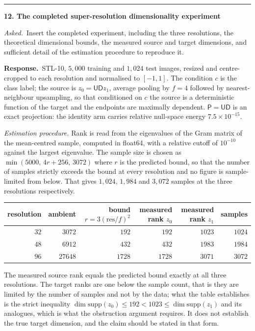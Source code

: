 \documentclass[11pt]{article}
\newenvironment{item12}[1]{%
  \par\medskip\noindent\rule{\textwidth}{0.7pt}\par\nobreak\smallskip
  \noindent\textbf{\large #1}\par\nobreak\smallskip
}{\par\medskip}
\newcommand{\ask}[1]{\noindent\emph{Asked.}\ #1\par\smallskip}
\newcommand{\resp}{\noindent\textbf{Response.}\ }
\begin{document}
\begin{item12}{12. The completed super-resolution dimensionality experiment}
\ask{Insert the completed experiment, including the three resolutions, the theoretical
dimensional bounds, the measured source and target dimensions, and sufficient detail of the
estimation procedure to reproduce it.}

\resp STL-10, $5{,}000$ training and $1{,}024$ test images, resized and centre-cropped to each
resolution and normalised to $[-1,1]$. The condition $c$ is the class label; the source is
$z_0=\mathsf{UD}z_1$, average pooling by $f=4$ followed by nearest-neighbour upsampling, so that
conditioned on $c$ the source is a deterministic function of the target and the endpoints are
maximally dependent. $\mathsf P=\mathsf{UD}$ is an exact projection: the identity arm carries
relative null-space energy $7.5\times10^{-15}$.

\emph{Estimation procedure.} Rank is read from the eigenvalues of the Gram matrix of the
mean-centred sample, computed in float64, with a relative cutoff of $10^{-10}$ against the
largest eigenvalue. The sample size is chosen as $\min(5000,\,4r+256,\,3072)$ where $r$ is the
predicted bound, so that the number of samples strictly exceeds the bound at every resolution and
no figure is sample-limited from below. That gives $1{,}024$, $1{,}984$ and $3{,}072$ samples at
the three resolutions respectively.

\begin{center}
\small
\begin{tabular}{@{}rrrrrr@{}}
\toprule
resolution & ambient & bound $r=3(\mathrm{res}/f)^2$ & measured rank $z_0$ &
measured rank $z_1$ & samples\\
\midrule
$32$ & $3072$  & $192$  & $192$  & $1023$ & $1024$\\
$48$ & $6912$  & $432$  & $432$  & $1983$ & $1984$\\
$96$ & $27648$ & $1728$ & $1728$ & $3071$ & $3072$\\
\bottomrule
\end{tabular}
\end{center}

The measured source rank equals the predicted bound exactly at all three resolutions. The target
ranks are one below the sample count, that is they are limited by the number of samples and not
by the data; what the table establishes is the strict inequality
$\dim\mathrm{supp}(z_0)\le 192 < 1023 \le \dim\mathrm{supp}(z_1)$ and its analogues, which is
what the obstruction argument requires. It does not establish the true target dimension, and the
claim should be stated in that form.


\end{item12}
\end{document}
